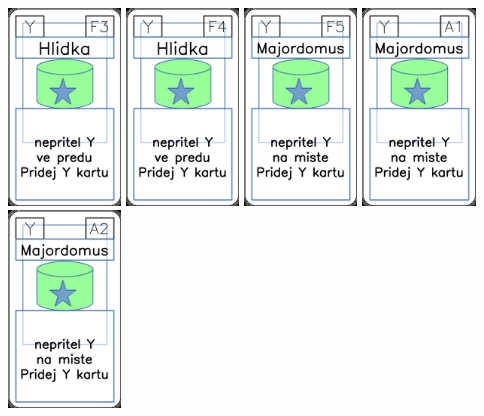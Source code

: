 \documentclass[a4paper]{article}
\begin{document}
	\includegraphics[width=3.0cm]{img-5_27}
	\includegraphics[width=3.0cm]{img-5_28}
	\includegraphics[width=3.0cm]{img-5_29}
	\includegraphics[width=3.0cm]{img-5_30}
	\includegraphics[width=3.0cm]{img-5_31}
\end{document}
